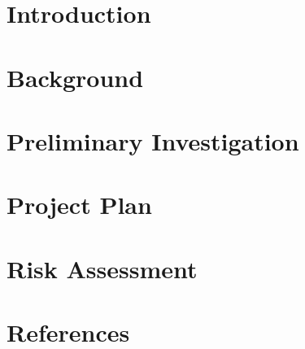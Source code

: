 






\section{Introduction}



\newpage

\section{Background}



\section{Preliminary Investigation}



\section{Project Plan}



\section{Risk Assessment}



\newpage

\section{References}

\printbibliography[heading=none]




